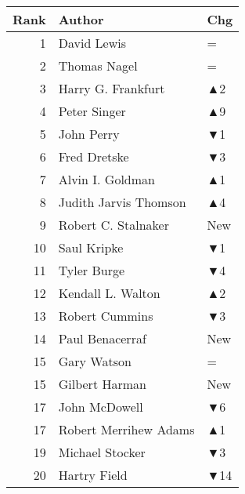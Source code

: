 \documentclass[
  10pt,
  letterpaper,
  DIV=11,
  numbers=noendperiod,
  twoside]{scrartcl}
\begin{document}
\begin{table}
\begin{minipage}{0.20\linewidth}
{\begin{tabular}{rll}
\toprule
Rank & Author & Chg\\
\midrule
1 & David Lewis & =\\
2 & Thomas Nagel & =\\
3 & Harry G. Frankfurt & \textcolor[RGB]{34,178,34}{▲2}\\
4 & Peter Singer & \textcolor[RGB]{34,178,34}{▲9}\\
5 & John Perry & \textcolor[RGB]{178,34,34}{▼1}\\
6 & Fred Dretske & \textcolor[RGB]{178,34,34}{▼3}\\
7 & Alvin I. Goldman & \textcolor[RGB]{34,178,34}{▲1}\\
8 & Judith Jarvis Thomson & \textcolor[RGB]{34,178,34}{▲4}\\
9 & Robert C. Stalnaker & \textcolor[RGB]{34,178,34}{New}\\
10 & Saul Kripke & \textcolor[RGB]{178,34,34}{▼1}\\
11 & Tyler Burge & \textcolor[RGB]{178,34,34}{▼4}\\
12 & Kendall L. Walton & \textcolor[RGB]{34,178,34}{▲2}\\
13 & Robert Cummins & \textcolor[RGB]{178,34,34}{▼3}\\
14 & Paul Benacerraf & \textcolor[RGB]{34,178,34}{New}\\
15 & Gary Watson & =\\
15 & Gilbert Harman & \textcolor[RGB]{34,178,34}{New}\\
17 & John McDowell & \textcolor[RGB]{178,34,34}{▼6}\\
17 & Robert Merrihew Adams & \textcolor[RGB]{34,178,34}{▲1}\\
19 & Michael Stocker & \textcolor[RGB]{178,34,34}{▼3}\\
20 & Hartry Field & \textcolor[RGB]{178,34,34}{▼14}\\
\bottomrule
\end{tabular}

}

\end{minipage}%
%
\begin{minipage}{0.20\linewidth}


\centering{

}
\end{minipage}
\end{table}
\end{document}
